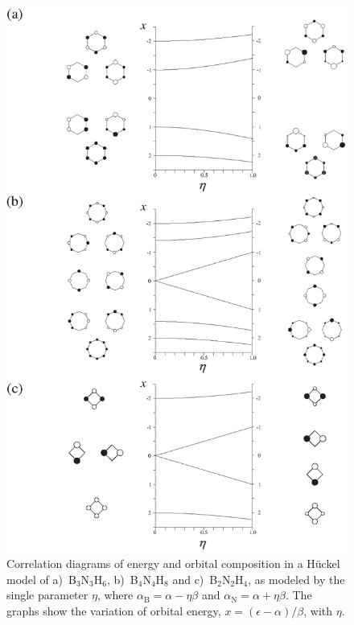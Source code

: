 \begin{figure}[htdp]
\begin{center}
\includegraphics[scale=0.95]{huckel/figures/fig2.eps}
\end{center}
\caption{Correlation diagrams of energy and orbital composition in a H\"uckel model of \mbox{a) B$_3$N$_3$H$_6$,} 
\mbox{b) B$_4$N$_4$H$_8$} and \mbox{c) B$_2$N$_2$H$_4$,} as modeled by the single parameter $\eta$, where
$\alpha_\mathrm{B}=\alpha-\eta\beta$ and $\alpha_\mathrm{N}=\alpha+\eta\beta$. The graphs show the
variation of orbital energy, $x=(\epsilon-\alpha)/\beta$, with $\eta$.}
\label{ch5.fig.f02}
\end{figure}

